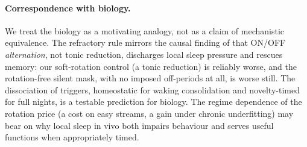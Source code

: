 \documentclass{article}
\begin{document}
\paragraph{Correspondence with biology.}
We treat the biology as a motivating analogy, not as a claim of mechanistic equivalence. The
refractory rule mirrors the causal finding of \citet{driessen2026} that ON/OFF
\emph{alternation}, not tonic reduction, discharges local sleep pressure and rescues memory:
our soft-rotation control (a tonic reduction) is reliably worse, and the rotation-free
silent mask, with no imposed off-periods at all, is worse still. The dissociation of
triggers, homeostatic for waking consolidation and novelty-timed for full nights, is a
testable prediction for biology. The regime dependence of the rotation price (a cost on easy
streams, a gain under chronic underfitting) may bear on why local sleep in vivo both impairs
behaviour \citep{vyazovskiy2011} and serves useful functions when appropriately timed.
\end{document}
